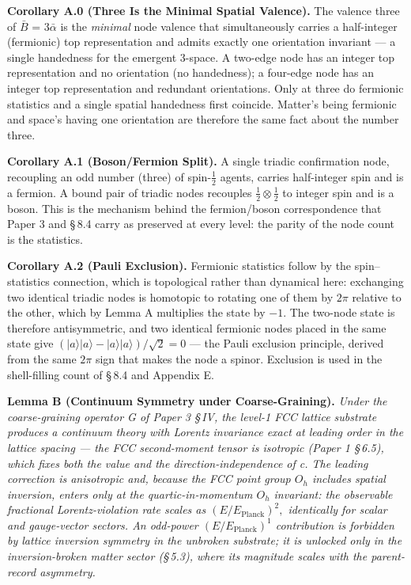 \documentclass[11pt,oneside]{report}
\theoremstyle{definition}
\theoremstyle{remark}
\begin{document}
\textbf{Corollary A.0 (Three Is the Minimal Spatial Valence).} The valence three
of \ensuremath{\bar{B}} = \ensuremath{3\bar{\alpha}} is the \emph{minimal} node valence that simultaneously
carries a half-integer (fermionic) top representation and admits exactly one
orientation invariant --- a single handedness for the emergent 3-space. A
two-edge node has an integer top representation and no orientation (no
handedness); a four-edge node has an integer top representation and redundant
orientations. Only at three do fermionic statistics and a single spatial
handedness first coincide. Matter's being fermionic and space's having one
orientation are therefore the same fact about the number three.

\textbf{Corollary A.1 (Boson/Fermion Split).} A single triadic
confirmation node, recoupling an odd number (three) of spin-\ensuremath{\tfrac{1}{2}} agents,
carries half-integer spin and is a fermion. A bound pair of triadic nodes
recouples \ensuremath{\tfrac{1}{2} \otimes \tfrac{1}{2}} to integer spin and is a boson. This is the
mechanism behind the fermion/boson correspondence that Paper 3 and \S\,8.4
carry as preserved at every level: the parity of the node count is the
statistics.

\textbf{Corollary A.2 (Pauli Exclusion).} Fermionic statistics follow by
the spin--statistics connection, which is topological rather than
dynamical here: exchanging two identical triadic nodes is homotopic to
rotating one of them by \ensuremath{2\pi} relative to the other, which by Lemma A
multiplies the state by \ensuremath{-1}. The two-node state is therefore
antisymmetric, and two identical fermionic nodes placed in the same state
give \ensuremath{(\lvert a\rangle\lvert a\rangle - \lvert a\rangle\lvert a\rangle)/\sqrt{2} = 0} ---
the Pauli exclusion principle, derived from the same \ensuremath{2\pi} sign that makes
the node a spinor. Exclusion is used in the shell-filling count of \S\,8.4
and Appendix E.

\textbf{Lemma B (Continuum Symmetry under Coarse-Graining).} \emph{Under
the coarse-graining operator G of Paper 3 \S\,IV, the level-1 FCC lattice
substrate produces a continuum theory with Lorentz invariance exact at
leading order in the lattice spacing --- the FCC second-moment tensor is
isotropic (Paper 1 \S\,6.5), which fixes both the value and the
direction-independence of c. The leading correction is anisotropic and,
because the FCC point group \ensuremath{O_{h}} includes spatial inversion, enters only
at the quartic-in-momentum \ensuremath{O_{h}} invariant: the observable fractional
Lorentz-violation rate scales as \ensuremath{(E/E_{\mathrm{Planck}})^{2},} identically for
scalar and gauge-vector sectors. An odd-power \ensuremath{(E/E_{\mathrm{Planck}})^{1}}
contribution is forbidden by lattice inversion symmetry in the unbroken
substrate; it is unlocked only in the inversion-broken matter sector
(\S\,5.3), where its magnitude scales with the parent-record asymmetry.}
\end{document}

